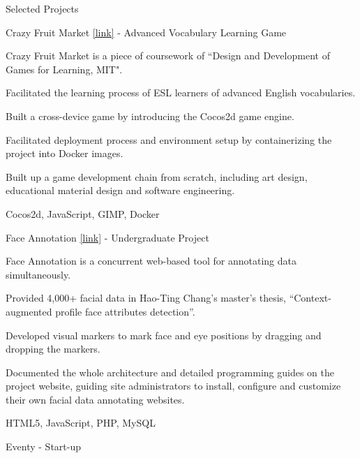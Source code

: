 \documentclass{cv}
\begin{document}
\begin{cvSection}{Selected Projects}

\begin{projectSubsection}{Crazy Fruit Market  \href{http://jasson15.github.io/crazy-fruit-market}{[link]}}{ - }{Advanced Vocabulary Learning Game}

\item Crazy Fruit Market is a piece of coursework of ``Design and Development of Games for Learning, MIT".
\item Facilitated the learning process of ESL learners of advanced English vocabularies.
\item Built a cross-device game by introducing the Cocos2d game engine.
\item Facilitated deployment process and environment setup by containerizing the project into Docker images.
\item Built up a game development chain from scratch, including art design, educational material design and software engineering.
\item Cocos2d, JavaScript, GIMP, Docker

\end{projectSubsection}

\begin{projectSubsection}{Face Annotation \href{http://cmlab.csie.ntu.edu.tw/~pi/face_annotation}{[link]}}{ - }{Undergraduate Project}

\item Face Annotation is a concurrent web-based tool for annotating data simultaneously.
\item Provided 4,000+ facial data in Hao-Ting Chang's master's thesis, ``Context-augmented profile face attributes detection''.
\item Developed visual markers to mark face and eye positions by dragging and dropping the markers. 
\item Documented the whole architecture and detailed programming guides on the project website, guiding site administrators to install, configure and customize their own facial data annotating websites. 
\item HTML5, JavaScript, PHP, MySQL

\end{projectSubsection}

\begin{projectSubsection}{Eventy}{ - }{Start-up}


\end{projectSubsection}
\end{cvSection}
\end{document}
